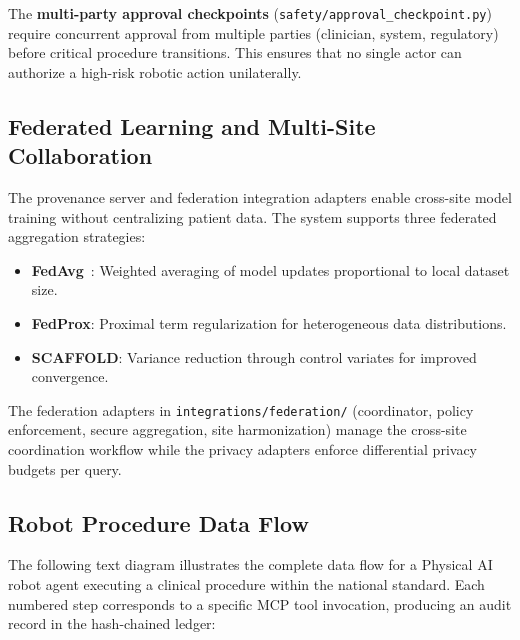 \documentclass{article}
\begin{document}
The \textbf{multi-party approval checkpoints} (\texttt{safety/approval\_checkpoint.py}) require concurrent approval from multiple parties (clinician, system, regulatory) before critical procedure transitions. This ensures that no single actor can authorize a high-risk robotic action unilaterally.

\subsection{Federated Learning and Multi-Site Collaboration}

The provenance server and federation integration adapters enable cross-site model training without centralizing patient data. The system supports three federated aggregation strategies:

\begin{itemize}[leftmargin=*]
\item \textbf{FedAvg}~\cite{mcmahan2017fedavg}: Weighted averaging of model updates proportional to local dataset size.
\item \textbf{FedProx}: Proximal term regularization for heterogeneous data distributions.
\item \textbf{SCAFFOLD}: Variance reduction through control variates for improved convergence.
\end{itemize}

The federation adapters in \texttt{integrations/federation/} (coordinator, policy enforcement, secure aggregation, site harmonization) manage the cross-site coordination workflow while the privacy adapters enforce differential privacy budgets per query.

\subsection{Robot Procedure Data Flow}

The following text diagram illustrates the complete data flow for a Physical AI robot agent executing a clinical procedure within the national standard. Each numbered step corresponds to a specific MCP tool invocation, producing an audit record in the hash-chained ledger:
\end{document}
